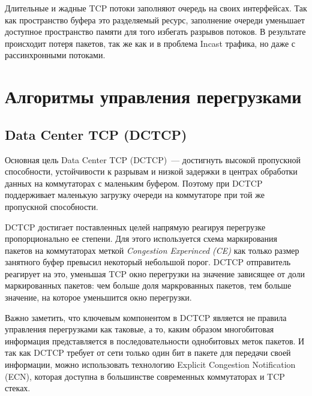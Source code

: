 \documentclass[14pt, a4paper,oneside]{extarticle}
\begin{document}
Длительные и жадные TCP потоки заполняют очередь на своих интерфейсах. Так как пространство буфера это разделяемый ресурс, заполнение очереди уменьшает доступное пространство памяти для того избегать разрывов потоков. В результате происходит потеря пакетов, так же как и в проблема Incast трафика, но даже с рассинхронными потоками.
\newpage

\section{Алгоритмы управления перегрузками}
\subsection{Data Center TCP (DCTCP)}
Основная цель Data Center TCP (DCTCP)~--- достигнуть высокой пропускной способности, устойчивости к разрывам и низкой задержки в центрах обработки данных на коммутаторах с маленьким буфером. Поэтому при DCTCP поддерживает маленькую загрузку очереди на коммутаторе при той же пропускной способности.

DCTCP достигает поставленных целей напрямую реагируя перегрузке пропорционально ее степени. Для этого используется схема маркирования пакетов на коммутаторах меткой \emph{Congestion Experinced (CE)} как только размер занятного буфер превысил некоторый небольшой порог. DCTCP отправитель реагирует на это, уменьшая TCP окно перегрузки на значение зависящее от доли маркированных пакетов: чем больше доля маркрованных пакетов, тем больше значение, на которое уменьшится окно перегрузки.

Важно заметить, что ключевым компонентом в DCTCP является не правила управления перегрузками как таковые, а то, каким образом многобитовая информация представляется в последовательности однобитовых меток пакетов. И так как DCTCP требует от сети только один бит в пакете для передачи своей информации, можно использовать технологию Explicit Congestion Notification (ECN), которая доступна в большинстве современных коммутаторах и TCP стеках.
\end{document}
